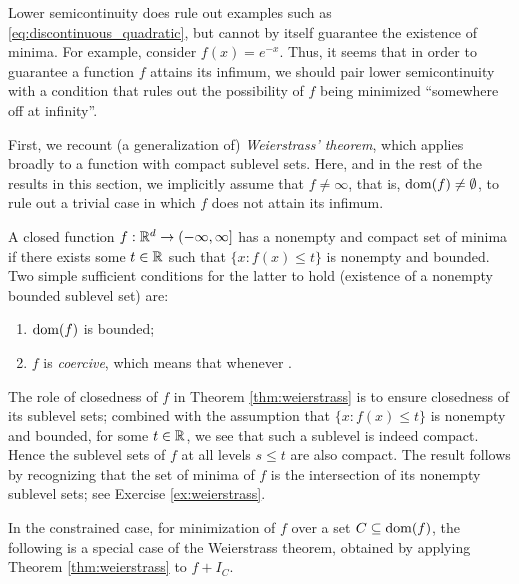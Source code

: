 Lower semicontinuity does rule out examples such as
\eqref{eq:discontinuous_quadratic}, but cannot by itself guarantee the existence
of minima. For example, consider $f(x) = e^{-x}$. Thus, it seems that in order
to guarantee a function $f$ attains its infimum, we should pair lower
semicontinuity with a condition that rules out the possibility of $f$ being
minimized ``somewhere off at infinity''.

First, we recount (a generalization of) \emph{Weierstrass' theorem}, which
applies broadly to a function with compact sublevel sets. Here, and in the rest
of the results in this section, we implicitly assume that $f \not= \infty$, that
is, $\operatorname{dom}(f) \not= \emptyset$, to rule out a trivial case in which $f$ does not 
attain its infimum.   

\begin{Theorem}
\label{thm:weierstrass}
A closed function $f : \mathbb{R}^d \to (-\infty, \infty]$ has a nonempty and compact
set of minima if there exists some $t \in \mathbb{R}$ such that $\{ x : f(x) \leq t\}$
is nonempty and bounded. Two simple sufficient conditions for the latter to
hold (existence of a nonempty bounded sublevel set) are:
\begin{enumerate}[label=(\roman*)]
\item $\operatorname{dom}(f)$ is bounded; 
\item $f$ is \emph{coercive}, which means that  whenever .  
\end{enumerate}
\end{Theorem}


The role of closedness of $f$ in Theorem \ref{thm:weierstrass} is to ensure
closedness of its sublevel sets; combined with the assumption that $\{x : f(x)
\leq t\}$ is nonempty and bounded, for some $t \in \mathbb{R}$, we see that such a
sublevel is indeed compact. Hence the sublevel sets of $f$ at all levels $s \leq 
t$ are also compact. The result follows by recognizing that the set of minima
of $f$ is the intersection of its nonempty sublevel sets; see Exercise
\ref{ex:weierstrass}.

In the constrained case, for minimization of $f$ over a set $C \subseteq
\operatorname{dom}(f)$, the following is a special case of the Weierstrass theorem, obtained
by applying Theorem \ref{thm:weierstrass} to $f + I_C$.

